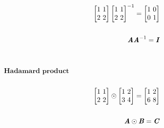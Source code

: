 \documentclass[12pt]{minimal}
\begin{document}
\begin{equation}
    \begin{split}
        \begin{bmatrix}
            1\ 1\\
            2\ 2\\
        \end{bmatrix}
        \begin{bmatrix}
            1\ 1\\
            2\ 2\\
        \end{bmatrix}^{-1} = 
        \begin{bmatrix}
            1\ 0\\
            0\ 1\\
        \end{bmatrix} \\ \\
        \textbf{\textit{A}}\textbf{\textit{A}}^{-1} = \textbf{\textit{I}}
    \end{split}
\end{equation} \\ \\ 




$\textbf{Hadamard product}$ \\ \\ 


\begin{equation}
    \begin{split}
        \begin{bmatrix}
            1\ 1\\
            2\ 2\\
        \end{bmatrix}
        \odot
        \begin{bmatrix}
            1\ 2\\
            3\ 4\\
        \end{bmatrix} = 
        \begin{bmatrix}
            1\ 2\\
            6\ 8\\
        \end{bmatrix} \\ \\
        \textbf{\textit{A}}\odot\textbf{\textit{B}} = \textbf{\textit{C}} 
    \end{split}
\end{equation} \\ \\ 
\end{document}
